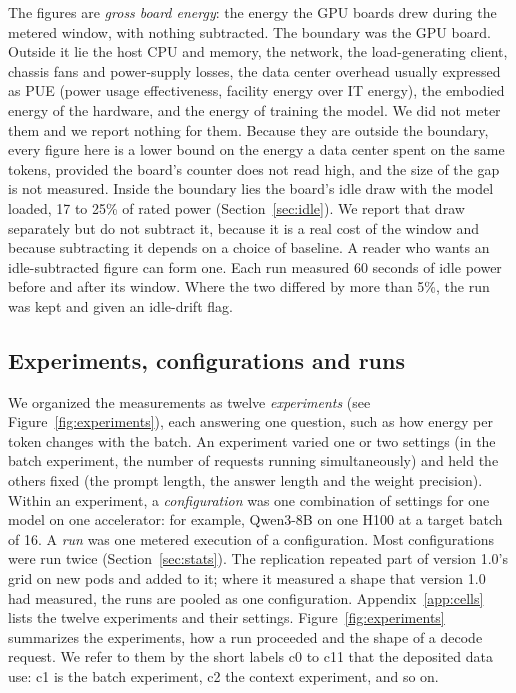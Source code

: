 \documentclass[11pt]{article}
\begin{document}
The figures are \emph{gross board energy}: the energy the GPU boards drew during the metered window, with nothing subtracted. The boundary was the GPU board. Outside it lie the host CPU and memory, the network, the load-generating client, chassis fans and power-supply losses, the data center overhead usually expressed as PUE (power usage effectiveness, facility energy over IT energy), the embodied energy of the hardware, and the energy of training the model. We did not meter them and we report nothing for them. Because they are outside the boundary, every figure here is a lower bound on the energy a data center spent on the same tokens, provided the board's counter does not read high, and the size of the gap is not measured. Inside the boundary lies the board's idle draw with the model loaded, 17 to 25\% of rated power (Section~\ref{sec:idle}). We report that draw separately but do not subtract it, because it is a real cost of the window and because subtracting it depends on a choice of baseline. A reader who wants an idle-subtracted figure can form one. Each run measured 60 seconds of idle power before and after its window. Where the two differed by more than 5\%, the run was kept and given an idle-drift flag.

\subsection{Experiments, configurations and runs}\label{sec:experiments}

We organized the measurements as twelve \emph{experiments} (see Figure~\ref{fig:experiments}), each answering one question, such as how energy per token changes with the batch. An experiment varied one or two settings (in the batch experiment, the number of requests running simultaneously) and held the others fixed (the prompt length, the answer length and the weight precision). Within an experiment, a \emph{configuration} was one combination of settings for one model on one accelerator: for example, Qwen3-8B on one H100 at a target batch of 16. A \emph{run} was one metered execution of a configuration. Most configurations were run twice (Section~\ref{sec:stats}). The replication repeated part of version 1.0's grid on new pods and added to it; where it measured a shape that version 1.0 had measured, the runs are pooled as one configuration. Appendix~\ref{app:cells} lists the twelve experiments and their settings. Figure~\ref{fig:experiments} summarizes the experiments, how a run proceeded and the shape of a decode request. We refer to them by the short labels c0 to c11 that the deposited data use: c1 is the batch experiment, c2 the context experiment, and so on.
\end{document}
